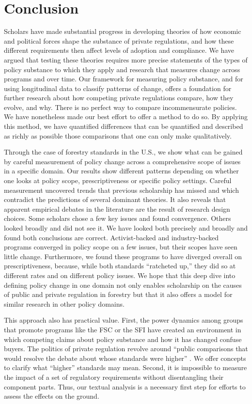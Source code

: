 \documentclass[
      12pt,
            Review ]{article}
\begin{document}
\section{Conclusion}\label{conclusion}

Scholars have made substantial progress in developing theories of how
economic and political forces shape the substance of private
regulations, and how these different requirements then affect levels of
adoption and compliance. We have argued that testing these theories
requires more precise statements of the types of policy substance to
which they apply and research that measures change across programs and
over time. Our framework for measuring policy substance, and for using
longitudinal data to classify patterns of change, offers a foundation
for further research about how competing private regulations compare,
how they evolve, and why. There is no perfect way to compare
incommensurate policies. We have nonetheless made our best effort to
offer a method to do so. By applying this method, we have quantified
differences that can be quantified and described as richly as possible
those comparisons that one can only make qualitatively.

Through the case of forestry standards in the U.S., we show what can be
gained by careful measurement of policy change across a comprehensive
scope of issues in a specific domain. Our results show different
patterns depending on whether one looks at policy scope,
prescriptiveness or specific policy settings. Careful measurement
uncovered trends that previous scholarship has missed and which
contradict the predictions of several dominant theories. It also reveals
that apparent empirical debates in the literature are the result of
research design choices. Some scholars chose a few key issues and found
convergence. Others looked broadly and did not see it. We have looked
both precisely and broadly and found both conclusions are correct.
Activist-backed and industry-backed programs converged in policy scope
on a few issues, but their scopes have seen little change. Furthermore,
we found these programs to have diverged overall on prescriptiveness,
because, while both standards ``ratcheted up,'' they did so at different
rates and on different policy issues. We hope that this deep dive into
defining policy change in one domain not only enables scholarship on the
causes of public and private regulation in forestry but that it also
offers a model for similar research in other policy domains.

This approach also has practical value. First, the power dynamics among
groups that promote programs like the FSC or the SFI have created an
environment in which competing claims about policy substance and how it
has changed confuse buyers. The politics of private regulation revolve
around ``public comparisons that would resolve the debate about whose
standards were higher'' \citep{Overdevest2010}. We offer concepts to
clarify what ``higher'' standards may mean. Second, it is impossible to
measure the impact of a set of regulatory requirements without
disentangling their component parts. Thus, our textual analysis is a
necessary first step for efforts to assess the effects on the ground.
\end{document}
